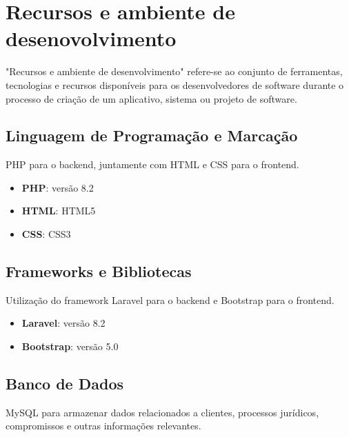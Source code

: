 \chapter{Recursos e ambiente de desenovolvimento}\label{sec:4}

"Recursos e ambiente de desenvolvimento" refere-se ao conjunto de ferramentas, tecnologias e recursos disponíveis para os desenvolvedores de software durante o processo de criação de um aplicativo, sistema ou projeto de software.

\cite{miletto2014desenvolvimento}
\section{Linguagem de Programação e Marcação}
PHP para o backend, juntamente com HTML e CSS para o frontend.

\begin{itemize}
    \item \textbf{PHP}: versão 8.2
\end{itemize}

\begin{itemize}
    \item \textbf{HTML}: HTML5
\end{itemize}

\begin{itemize}
    \item \textbf{CSS}: CSS3
\end{itemize}
\cite{converse2003php}
\vspace{\baselineskip}

\section{Frameworks e Bibliotecas}
Utilização do framework Laravel para o backend e Bootstrap para o frontend.

\begin{itemize}
    \item \textbf{Laravel}: versão 8.2
\end{itemize}

\begin{itemize}
    \item \textbf{Bootstrap}: versão 5.0
\end{itemize}

\cite{bento2021desenvolvimento}

\vspace{\baselineskip}

\section{Banco de Dados}
MySQL para armazenar dados relacionados a clientes, processos jurídicos, compromissos e outras informações relevantes.

